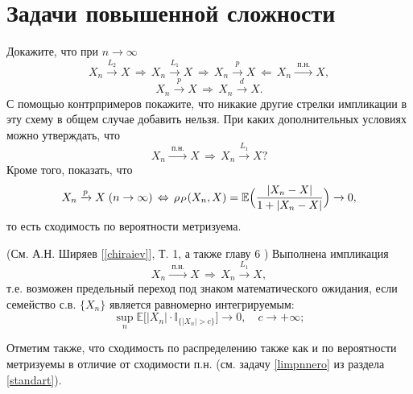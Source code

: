 
\section{Задачи повышенной сложности}
\label{hard}

\begin{problem}
Докажите, что при $n\to\infty$ 
$$
X_n\xrightarrow{L_2} X \,\Rightarrow\, X_n\xrightarrow{L_1}X \, \Rightarrow\, X_n\xrightarrow{p}X 
\, \Leftarrow\, X_n\xrightarrow{\text{ п.н. }}X , 
$$
$$
X_n\xrightarrow{p}X \, \Rightarrow\, X_n\xrightarrow{d}X . 
$$
С помощью контрпримеров покажите, что никакие другие стрелки импликации в эту схему в общем случае добавить нельзя. 
При каких дополнительных условиях можно утверждать, что 
$$
X_n\xrightarrow{\text{ п.н. }}X  \, \Rightarrow\, X_n\xrightarrow{L_1}X ?
$$
Кроме того, показать, что 
$$
X_n\xrightarrow{p} X \; (n\to\infty) \,\Leftrightarrow\, \rho_P(X_n,X)={\mathbb E}\Bigl( \frac{|X_n-X|}{1+|X_n-X|}\Bigr)
\xrightarrow{} 0 , 
$$
то есть сходимость по вероятности метризуема.
\end{problem}

\begin{remark} (См. А.Н. Ширяев [\ref{chiraiev}], Т. 1, а также главу 6 \cite{Gupta})
Выполнена импликация 
$$
X_n\xrightarrow{\text{ п.н. }}X  \, \Rightarrow\, X_n\xrightarrow{L_1}X , 
$$
т.е. возможен предельный переход под знаком математического ожидания, если семейство с.в. $\{ X_n\}$ является равномерно интегрируемым: 
$$
\sup\limits_n {\mathbb E}\bigl[ |X_n|\cdot {\mathbb I}_{\{ |X_n|>c\}} \bigr] \rightarrow 0, \quad c \to +\infty; 
$$

Отметим также, что сходимость по распределению также как и по вероятности метризуемы в отличие от сходимости п.н. (см. задачу \ref{limpnnero} из  раздела \ref{standart}). 

\end{remark}

